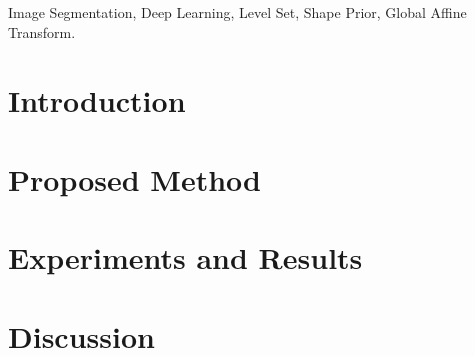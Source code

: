 \documentclass[journal]{IEEEtran}
\begin{document}


\maketitle

\begin{abstract}

\end{abstract}\label{Abstract}

\begin{IEEEkeywords}
Image Segmentation, Deep Learning, Level Set, Shape Prior, Global Affine Transform.
\end{IEEEkeywords}


%
\IEEEpeerreviewmaketitle



\section{Introduction}

\label{sec:Introduction}

\section{Proposed Method}

\label{sec:Propsed Work}

\section{Experiments and Results}

\label{sec:Experiments and Results}

\section{Discussion}

\label{sec:Discussion}
\end{document}
